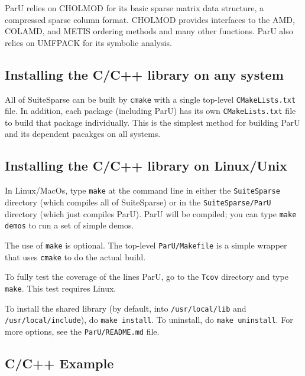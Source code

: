 \documentclass[12pt]{article}
\begin{document}
ParU relies on CHOLMOD for its basic sparse matrix data structure, a compressed
sparse column format.  CHOLMOD provides interfaces to the AMD, COLAMD, and
METIS ordering methods and many other functions. ParU also relies on UMFPACK
for its symbolic analysis.

\subsection{Installing the C/C++ library on any system}

All of SuiteSparse can be built by \verb'cmake' with a single top-level
\verb'CMakeLists.txt' file.  In addition, each package (including ParU) has its
own \verb'CMakeLists.txt' file to build that package individually.  This is the
simplest method for building ParU and its dependent pacakges on all systems.

\subsection{Installing the C/C++ library on Linux/Unix}

In Linux/MacOs, type \verb'make' at the command line in either the
\verb'SuiteSparse' directory (which compiles all of SuiteSparse) or in the
\verb'SuiteSparse/ParU' directory (which just compiles ParU).  ParU will be
compiled; you can type \verb'make demos' to run a set of simple demos.

The use of \verb'make' is optional.  The top-level \verb'ParU/Makefile' is
a simple wrapper that uses \verb'cmake' to do the actual build.

To fully test the coverage of the lines ParU, go to the \verb'Tcov'
directory and type \verb'make'.  This test requires Linux.

To install the shared library (by default, into \verb'/usr/local/lib' and
\verb'/usr/local/include'), do {\tt make install}.  To uninstall, do
{\tt make uninstall}.  For more options, see the {\tt ParU/README.md} file.

\subsection{C/C++ Example}
\end{document}
